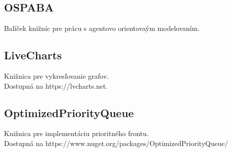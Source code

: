\documentclass[letterpaper]{article}
\begin{document}
	\subsection*{OSPABA}
	
	\noindent Balíček knižníc pre prácu s agentovo orientovaým modelovaním.
	
	\subsection*{LiveCharts}
	
	\noindent Knižnica pre vykresľovanie grafov. \\
	Dostupná na https://lvcharts.net.
	
	\subsection*{OptimizedPriorityQueue}
	
	\noindent Knižnica pre implementáciu prioritného frontu. \\ 
	Dostupná na https://www.nuget.org/packages/OptimizedPriorityQueue/
	
\end{document}

